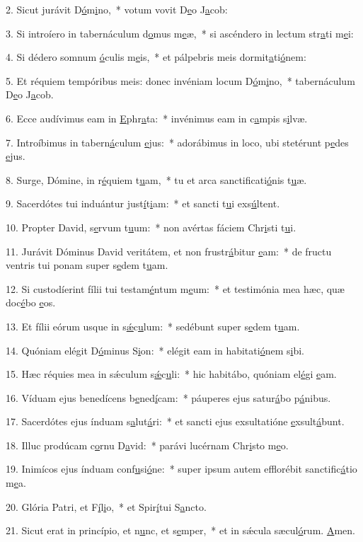2. Sicut jurávit D\uline{ó}m\uline{i}no,~* votum vovit D\uline{e}o J\uline{a}cob:\par 
3. Si introíero in tabernáculum d\uline{o}mus m\uline{e}æ,~* si ascéndero in lectum str\uline{a}ti m\uline{e}i:\par 
4. Si dédero somnum \uline{ó}culis m\uline{e}is,~* et pálpebris meis dormit\uline{a}ti\uline{ó}nem:\par 
5. Et réquiem tempóribus meis: donec invéniam locum D\uline{ó}m\uline{i}no,~* tabernáculum D\uline{e}o J\uline{a}cob.\par 
6. Ecce audívimus eam in \uline{E}phr\uline{a}ta:~* invénimus eam in c\uline{a}mpis s\uline{i}lvæ.\par 
7. Introíbimus in tabern\uline{á}culum \uline{e}jus:~* adorábimus in loco, ubi stetérunt p\uline{e}des \uline{e}jus.\par 
8. Surge, Dómine, in r\uline{é}quiem t\uline{u}am,~* tu et arca sanctificati\uline{ó}nis t\uline{u}æ.\par 
9. Sacerdótes tui induántur just\uline{í}t\uline{i}am:~* et sancti t\uline{u}i exs\uline{ú}ltent.\par 
10. Propter David, s\uline{e}rvum t\uline{u}um:~* non avértas fáciem Chr\uline{i}sti t\uline{u}i.\par 
11. Jurávit Dóminus David veritátem, et non frustr\uline{á}bitur \uline{e}am:~* de fructu ventris tui ponam super s\uline{e}dem t\uline{u}am.\par 
12. Si custodíerint fílii tui testam\uline{é}ntum m\uline{e}um:~* et testimónia mea hæc, quæ doc\uline{é}bo \uline{e}os.\par 
13. Et fílii eórum usque in s\uline{ǽ}c\uline{u}lum:~* sedébunt super s\uline{e}dem t\uline{u}am.\par 
14. Quóniam elégit D\uline{ó}minus S\uline{i}on:~* elégit eam in habitati\uline{ó}nem s\uline{i}bi.\par 
15. Hæc réquies mea in sǽculum s\uline{ǽ}c\uline{u}li:~* hic habitábo, quóniam el\uline{é}gi \uline{e}am.\par 
16. Víduam ejus benedícens b\uline{e}ned\uline{í}cam:~* páuperes ejus satur\uline{á}bo p\uline{á}nibus.\par 
17. Sacerdótes ejus índuam s\uline{a}lut\uline{á}ri:~* et sancti ejus exsultatióne \uline{e}xsult\uline{á}bunt.\par 
18. Illuc prodúcam c\uline{o}rnu D\uline{a}vid:~* parávi lucérnam Chr\uline{i}sto m\uline{e}o.\par 
19. Inimícos ejus índuam conf\uline{u}si\uline{ó}ne:~* super ipsum autem efflorébit sanctific\uline{á}tio m\uline{e}a.\par 
20. Glória Patri, et F\uline{í}l\uline{i}o,~* et Spir\uline{í}tui S\uline{a}ncto.\par 
21. Sicut erat in princípio, et n\uline{u}nc, et s\uline{e}mper,~* et in sǽcula sæcul\uline{ó}rum. \uline{A}men.\par 
